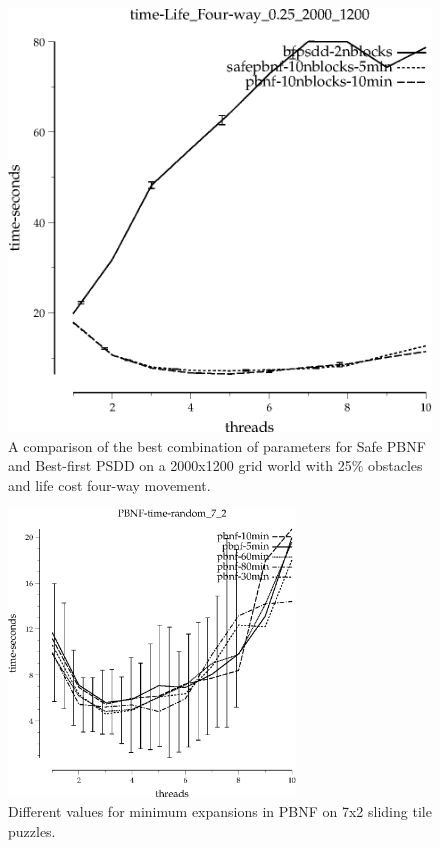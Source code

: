 \documentclass{article}
\begin{document}
\begin{figure}[t]
\begin{center}
\includegraphics{grid_life_four-way_0.25_2000_1200/time-Life_Four-way_0.25_2000_1200.eps}
\caption{A comparison of the best combination of parameters for Safe
  PBNF and Best-first PSDD on a 2000x1200 grid world with 25\%
  obstacles and life cost four-way movement.}
\end{center}
\end{figure}


\begin{figure}[h!]
\includegraphics[width=3in]{../graphs/tiles_random_7_2/PBNF-time-random_7_2.eps}
\caption{Different values for minimum expansions in PBNF on 7x2 sliding tile puzzles.}
\end{figure}
\end{document}
